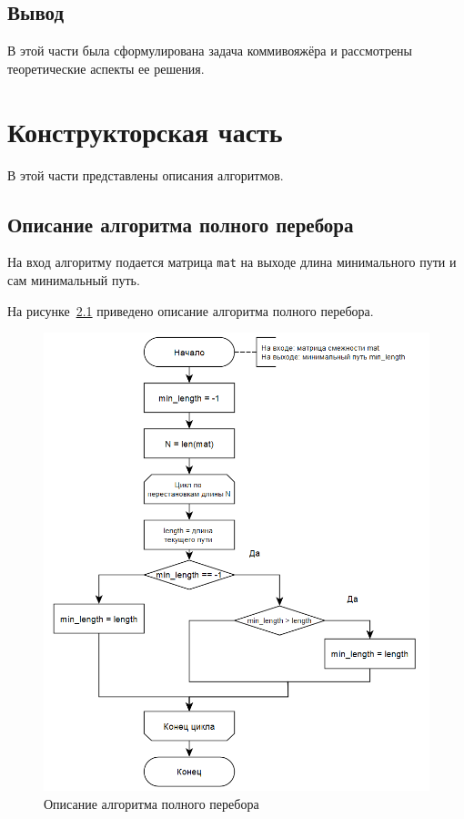 \documentclass[a4paper, 12pt]{extreport}
\begin{document}
\section{Вывод}

В этой части была сформулирована задача коммивояжёра и рассмотрены теоретические аспекты ее решения.

\chapter{Конструкторская часть}

В этой части представлены описания алгоритмов.

\section{Описание алгоритма полного перебора}

На вход алгоритму подается матрица \texttt{mat} на выходе длина минимального пути и сам минимальный путь.

На рисунке~\ref{scheme:full} приведено описание алгоритма полного перебора.
	
\begin{figure}[h]
	\centering
	\includegraphics[scale=0.7]{tools/full.png}
	\caption{Описание алгоритма полного перебора}
	\label{scheme:full}
\end{figure}
\end{document}
